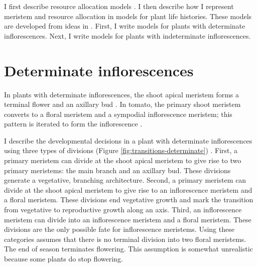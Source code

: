 \documentclass[12pt, oneside,titlepage]{article}   	%
\begin{document}
I first describe resource allocation models \cite{cohen1971,king1982a}. I then describe how I represent meristem and resource allocation in models for plant life histories. These models are developed from ideas in \cite{fox1992a,kellogg2000,prusinkiewicz2007,itzkovitz2012}. First, I write models for plants with determinate inflorescences. Next, I write models for plants with indeterminate inflorescences. 


\section{Determinate inflorescences}

In plants with determinate inflorescences, the shoot apical meristem forms a terminal flower and an axillary bud \cite{bartlett2014}. In tomato, the primary shoot meristem converts to a floral meristem and a sympodial inflorescence meristem; this pattern is iterated to form the inflorescence \cite{park2012}. 

I describe the developmental decisions in a plant with determinate inflorescences using three types of divisions (Figure \ref{fig:transitions-determinate}) \cite{itzkovitz2012}. First, a primary meristem can divide at the shoot apical meristem to give rise to two primary meristems: the main branch and an axillary bud. These divisions generate a vegetative, branching architecture. Second, a primary meristem can divide at the shoot apical meristem to give rise to an inflorescence meristem and a floral meristem. These divisions end vegetative growth and mark the transition from vegetative to reproductive growth along an axis. Third, an inflorescence meristem can divide into an inflorescence meristem and a floral meristem. These divisions are the only possible fate for inflorescence meristems. Using these categories assumes that there is no terminal division into two floral meristems. The end of season terminates flowering. This assumption is somewhat unrealistic because some plants do stop flowering. 
\end{document}
